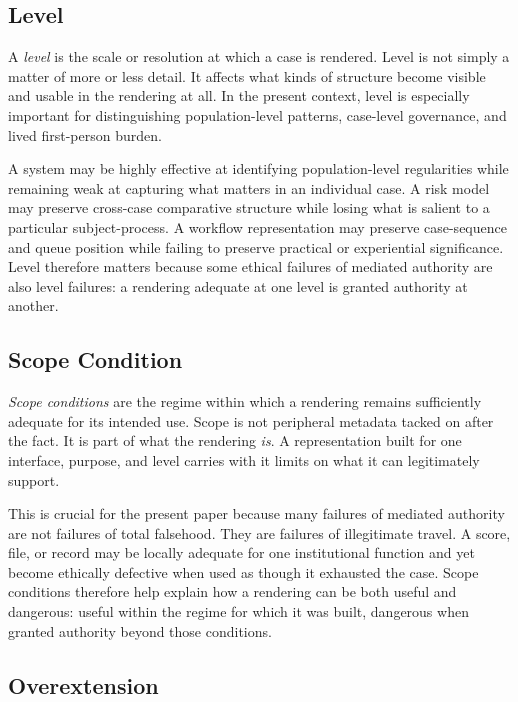 \documentclass[11pt]{article}
\renewcommand{\emph}[1]{\textit{#1}}
\begin{document}
\subsection{Level}

A \emph{level} is the scale or resolution at which a case is rendered. Level is not simply a matter of more or less detail. It affects what kinds of structure become visible and usable in the rendering at all. In the present context, level is especially important for distinguishing population-level patterns, case-level governance, and lived first-person burden. \cite{Swanson2026ConstrainedDescribability}

A system may be highly effective at identifying population-level regularities while remaining weak at capturing what matters in an individual case. A risk model may preserve cross-case comparative structure while losing what is salient to a particular subject-process. A workflow representation may preserve case-sequence and queue position while failing to preserve practical or experiential significance. Level therefore matters because some ethical failures of mediated authority are also level failures: a rendering adequate at one level is granted authority at another.

\subsection{Scope Condition}

\emph{Scope conditions} are the regime within which a rendering remains sufficiently adequate for its intended use. Scope is not peripheral metadata tacked on after the fact. It is part of what the rendering \emph{is}. A representation built for one interface, purpose, and level carries with it limits on what it can legitimately support. \cite{Swanson2026ConstrainedDescribability,Swanson2026ConstraintConditionDisclosure}

This is crucial for the present paper because many failures of mediated authority are not failures of total falsehood. They are failures of illegitimate travel. A score, file, or record may be locally adequate for one institutional function and yet become ethically defective when used as though it exhausted the case. Scope conditions therefore help explain how a rendering can be both useful and dangerous: useful within the regime for which it was built, dangerous when granted authority beyond those conditions.

\subsection{Overextension}
\end{document}

